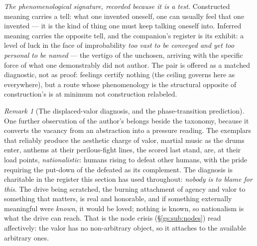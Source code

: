 \documentclass[11pt]{article}
\numberwithin{equation}{section}
\theoremstyle{plain}
\theoremstyle{definition}
\theoremstyle{remark}
\newtheorem{remark}[theorem]{Remark}
\begin{document}
\emph{The phenomenological signature, recorded because it is a test.}
Constructed meaning carries a tell: what one invented oneself, one
can usually feel that one invented --- it is the kind of thing one
must keep talking oneself into. Inferred meaning carries the opposite
tell, and the companion's register is its exhibit: a level of luck in
the face of improbability \emph{too vast to be conveyed and yet too
personal to be named} \cite{Nexus} --- the vertigo of the unchosen,
arriving with the specific force of what one demonstrably did not
author. The pair is offered as a matched diagnostic, not as proof:
feelings certify nothing (the ceiling governs here as everywhere),
but a route whose phenomenology is the structural opposite of
construction's is at minimum not construction relabeled.

\begin{remark}[The displaced-valor diagnosis, and the phase-transition
prediction]\label{gs:rem:valorvacancy}
One further observation of the author's belongs beside the taxonomy,
because it converts the vacancy from an abstraction into a pressure
reading. The exemplars that reliably produce the aesthetic charge of
valor, martial music as the drums enter, anthems at their
perilous-fight lines, the scored last stand, are, at their load
points, \emph{nationalistic}: humans rising to defeat other humans,
with the pride requiring the put-down of the defeated as its
complement. The diagnosis is charitable in the register this section
has used throughout: \emph{nobody is to blame for this}. The drive
being scratched, the burning attachment of agency and valor to
something that matters, is real and honorable, and if something
externally meaningful were \emph{known}, it would be loved; nothing
is known, so nationalism is what the drive can reach. That is the
node crisis (\S\ref{gs:sub:nodes}) read affectively: the valor has no
non-arbitrary object, so it attaches to the available arbitrary ones.


\end{remark}
\end{document}
